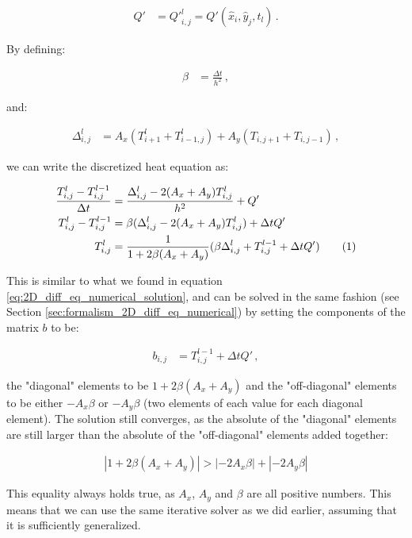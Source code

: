 \documentclass[reprint,english,notitlepage]{revtex4-1}  %
\newcommand\numberthis{\addtocounter{equation}{1}\tag{\theequation}}
\begin{document}
\begin{align*}
Q' &= {Q'}_{i,j}^l = Q'(\hat{x}_i,\hat{y}_j,t_l) \, .
\end{align*} 

By defining:

\begin{align*}
\beta &= \frac{\Delta t}{h^2} \, ,
\end{align*}

and:

\begin{align*}
\Delta_{i,j}^l &= A_x(T_{i+1}^l + T_{i-1,j}^l) + A_y(T_{i,j+1} + T_{i,j-1}) \, ,
\end{align*}

we can write the discretized heat equation as:

\begin{align*}
\frac{T_{i,j}^l - T_{i,j}^{l-1}}{\Delta t} &= \frac{\Delta_{i,j}^l - 2(A_x+A_y)T_{i,j}^l}{h^2} + Q' \\
T_{i,j}^l - T_{i,j}^{l-1} &= \beta (\Delta_{i,j}^l - 2(A_x+A_y)T_{i,j}^l) + \Delta t Q' \\
T_{i,j}^l &= \frac{1}{1 + 2\beta (A_x+A_y) } (\beta \Delta_{i,j}^l + T_{i,j}^{l-1} + \Delta t Q') \numberthis \label{eq:heat_eq_with_source_term_numerical_solution}
\end{align*}

This is similar to what we found in equation \eqref{eq:2D_diff_eq_numerical_solution}, and can be solved in the same fashion (see Section \ref{sec:formalism_2D_diff_eq_numerical}) by setting the components of the matrix $b$ to be:

\begin{align*}
b_{i,j} &= T_{i,j}^{l-1} + \Delta t Q' \, ,
\end{align*} 

the "diagonal" elements to be $1 + 2\beta(A_x+A_y)$ and the "off-diagonal" elements to be either $-A_x\beta$ or $-A_y\beta $ (two elements of each value for each diagonal element). The solution still converges, as the absolute of the "diagonal" elements are still larger than the absolute of the "off-diagonal" elements added together:

\begin{align*}
|1 + 2\beta(A_x + A_y)| > |-2A_x \beta| + |-2A_y \beta |
\end{align*}

This equality always holds true, as $A_x$, $A_y$ and $\beta$ are all positive numbers. This means that we can use the same iterative solver as we did earlier, assuming that it is sufficiently generalized.
\end{document}
